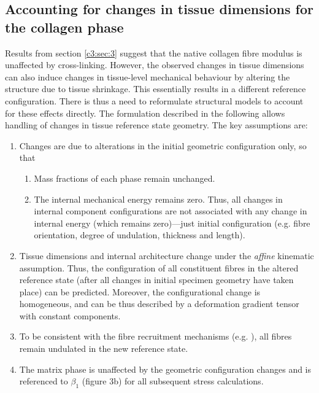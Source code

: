 \subsection{Accounting for changes in tissue dimensions for the collagen phase} \label{c3:sec:42}

    Results from section \ref{c3:sec:3} suggest that the native collagen fibre modulus is unaffected by cross-linking. However, the observed changes in tissue dimensions can also induce changes in tissue-level mechanical behaviour by altering the structure due to tissue shrinkage. This essentially results in a different reference configuration. There is thus a need to reformulate structural models to account for these effects directly. The formulation described in the following allows handling of changes in tissue reference state geometry. The key assumptions are:
        \begin{enumerate}
            \item Changes are due to alterations in the initial geometric configuration only, so that
            \begin{enumerate}
                \item Mass fractions of each phase remain unchanged.
                \item The internal mechanical energy remains zero. Thus, all changes in internal component configurations are not associated with any change in internal energy (which remains zero)—just initial configuration (e.g. fibre orientation, degree of undulation, thickness and length).
            \end{enumerate}
            \item Tissue dimensions and internal architecture change under the \textit{affine} kinematic assumption. Thus, the configuration of all constituent fibres in the altered reference state (after all changes in initial specimen geometry have taken place) can be predicted. Moreover, the configurational change is homogeneous, and can be thus described by a deformation gradient tensor with constant components.
            \item To be consistent with the fibre recruitment mechanisms (e.g. \cite{sacks_incorporation_2003}\cite{fata_insights_2014}), all fibres remain undulated in the new reference state.
            \item The matrix phase is unaffected by the geometric configuration changes and is referenced to $\beta_1$ (figure 3b) for all subsequent stress calculations.
        \end{enumerate}
        
